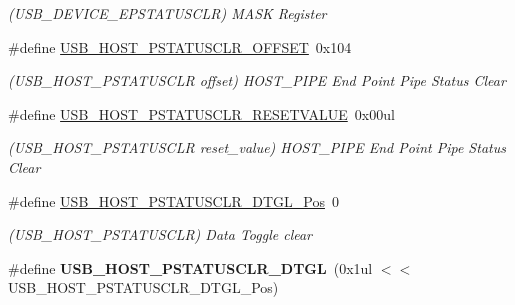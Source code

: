 \begin{DoxyCompactItemize}
\begin{DoxyCompactList}\small\item\em (U\+S\+B\+\_\+\+D\+E\+V\+I\+C\+E\+\_\+\+E\+P\+S\+T\+A\+T\+U\+S\+C\+L\+R) M\+A\+S\+K Register \end{DoxyCompactList}\item 
\hypertarget{group___s_a_m_l21___u_s_b_ga92129ccf601aee20b48c49d623268f07}{}\#define \hyperlink{group___s_a_m_l21___u_s_b_ga92129ccf601aee20b48c49d623268f07}{U\+S\+B\+\_\+\+H\+O\+S\+T\+\_\+\+P\+S\+T\+A\+T\+U\+S\+C\+L\+R\+\_\+\+O\+F\+F\+S\+E\+T}~0x104\label{group___s_a_m_l21___u_s_b_ga92129ccf601aee20b48c49d623268f07}

\begin{DoxyCompactList}\small\item\em (U\+S\+B\+\_\+\+H\+O\+S\+T\+\_\+\+P\+S\+T\+A\+T\+U\+S\+C\+L\+R offset) H\+O\+S\+T\+\_\+\+P\+I\+P\+E End Point Pipe Status Clear \end{DoxyCompactList}\item 
\hypertarget{group___s_a_m_l21___u_s_b_gacaa82db7276caf9ad65dbd60cae53209}{}\#define \hyperlink{group___s_a_m_l21___u_s_b_gacaa82db7276caf9ad65dbd60cae53209}{U\+S\+B\+\_\+\+H\+O\+S\+T\+\_\+\+P\+S\+T\+A\+T\+U\+S\+C\+L\+R\+\_\+\+R\+E\+S\+E\+T\+V\+A\+L\+U\+E}~0x00ul\label{group___s_a_m_l21___u_s_b_gacaa82db7276caf9ad65dbd60cae53209}

\begin{DoxyCompactList}\small\item\em (U\+S\+B\+\_\+\+H\+O\+S\+T\+\_\+\+P\+S\+T\+A\+T\+U\+S\+C\+L\+R reset\+\_\+value) H\+O\+S\+T\+\_\+\+P\+I\+P\+E End Point Pipe Status Clear \end{DoxyCompactList}\item 
\hypertarget{group___s_a_m_l21___u_s_b_gaa135a18eaf6212f305d744bae2fec39e}{}\#define \hyperlink{group___s_a_m_l21___u_s_b_gaa135a18eaf6212f305d744bae2fec39e}{U\+S\+B\+\_\+\+H\+O\+S\+T\+\_\+\+P\+S\+T\+A\+T\+U\+S\+C\+L\+R\+\_\+\+D\+T\+G\+L\+\_\+\+Pos}~0\label{group___s_a_m_l21___u_s_b_gaa135a18eaf6212f305d744bae2fec39e}

\begin{DoxyCompactList}\small\item\em (U\+S\+B\+\_\+\+H\+O\+S\+T\+\_\+\+P\+S\+T\+A\+T\+U\+S\+C\+L\+R) Data Toggle clear \end{DoxyCompactList}\item 
\hypertarget{group___s_a_m_l21___u_s_b_gaa05a0deb0a875d19edadfecb45f0ac1f}{}\#define {\bfseries U\+S\+B\+\_\+\+H\+O\+S\+T\+\_\+\+P\+S\+T\+A\+T\+U\+S\+C\+L\+R\+\_\+\+D\+T\+G\+L}~(0x1ul $<$$<$ U\+S\+B\+\_\+\+H\+O\+S\+T\+\_\+\+P\+S\+T\+A\+T\+U\+S\+C\+L\+R\+\_\+\+D\+T\+G\+L\+\_\+\+Pos)\label{group___s_a_m_l21___u_s_b_gaa05a0deb0a875d19edadfecb45f0ac1f}


\end{DoxyCompactItemize}
